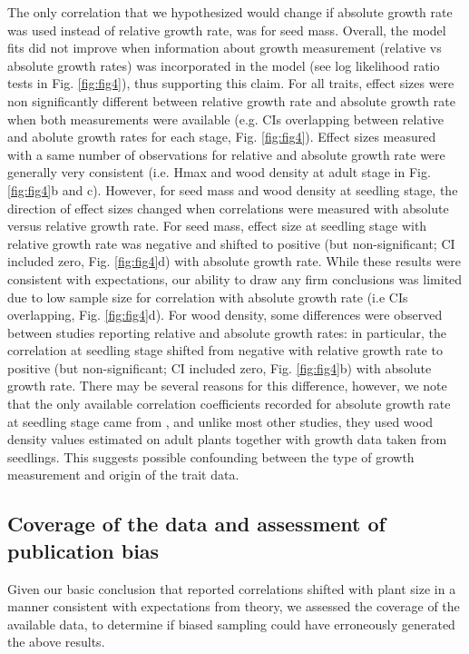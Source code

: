 \documentclass[a4paper,11pt]{article}
\begin{document}
The only correlation that we hypothesized would change if absolute growth rate was used instead of relative growth rate, was for seed mass. Overall, the model fits did not improve when information about growth measurement (relative vs absolute growth rates) was incorporated in the model (see log likelihood ratio tests in Fig. \ref{fig:fig4}), thus supporting this claim. For all traits, effect sizes were non significantly different between relative growth rate and absolute growth rate when both measurements were available (e.g. CIs overlapping between relative and abolute growth rates for each stage, Fig. \ref{fig:fig4}). Effect sizes measured with a same number of observations for relative and absolute growth rate were generally very consistent (i.e. Hmax and wood density at adult stage in Fig. \ref{fig:fig4}b and c). However, for seed mass and wood density at seedling stage, the direction of effect sizes changed when correlations were measured with absolute versus relative growth rate. For seed mass, effect size at seedling stage with relative growth rate was negative and shifted to positive (but non-significant; CI included zero, Fig. \ref{fig:fig4}d) with absolute growth rate. While these results were consistent with expectations, our ability to draw any firm conclusions was limited due to low sample size for correlation with absolute growth rate (i.e CIs overlapping, Fig. \ref{fig:fig4}d). For wood density, some differences were observed between studies reporting relative and absolute growth rates: in particular, the correlation at seedling stage shifted from negative with relative growth rate to positive (but non-significant; CI included zero, Fig. \ref{fig:fig4}b) with absolute growth rate. There may be several reasons for this difference, however, we note that the only available correlation coefficients recorded for absolute growth rate at seedling stage came from \citet{Augspurger:1984ct}, and unlike most other studies, they used wood density values estimated on adult plants together with growth data taken from seedlings. This suggests possible confounding between the type of growth measurement and origin of the trait data.

\subsection*{Coverage of the data and assessment of publication bias}

Given our basic conclusion that reported correlations shifted with plant size in a manner consistent with expectations from theory, we assessed the coverage of the available data, to determine if biased sampling could have erroneously generated the above results.
\end{document}
